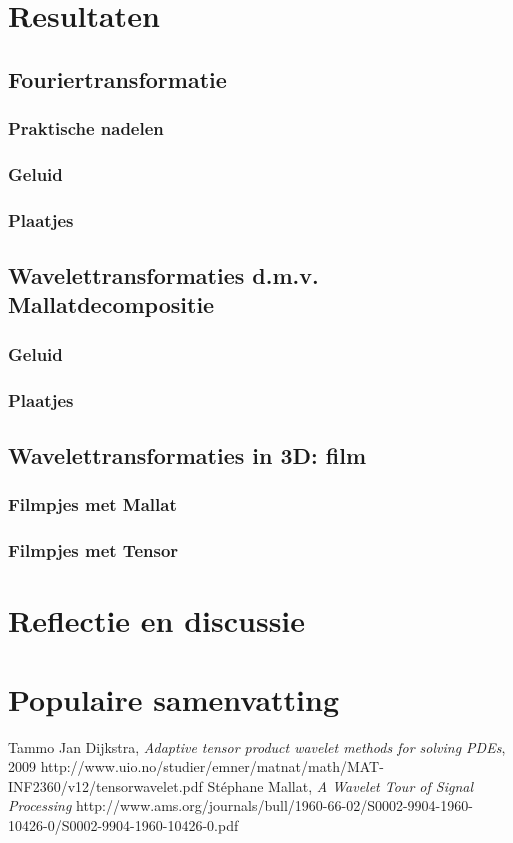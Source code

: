 \documentclass[11pt]{report}
\theoremstyle{plain}
\theoremstyle{definition}
\theoremstyle{remark}
\begin{document}
\chapter{Resultaten}
\section{Fouriertransformatie}
\subsection{Praktische nadelen}
\subsection{Geluid}
\subsection{Plaatjes}

\section{Wavelettransformaties d.m.v. Mallatdecompositie}
\subsection{Geluid}
\subsection{Plaatjes}

\section{Wavelettransformaties in 3D: film}
\subsection{Filmpjes met Mallat}
\subsection{Filmpjes met Tensor}

\chapter{Reflectie en discussie}
\chapter{Populaire samenvatting}

\begin{thebibliography}{9}

Tammo Jan Dijkstra,
\emph{Adaptive tensor product wavelet methods for solving PDEs}, 2009
http://www.uio.no/studier/emner/matnat/math/MAT-INF2360/v12/tensorwavelet.pdf
St\'ephane Mallat,
\emph{A Wavelet Tour of Signal Processing}
http://www.ams.org/journals/bull/1960-66-02/S0002-9904-1960-10426-0/S0002-9904-1960-10426-0.pdf
\end{thebibliography}
\end{document}
